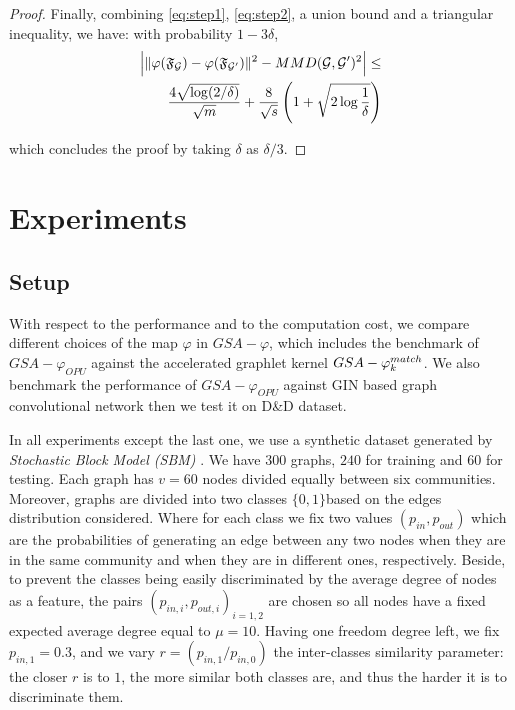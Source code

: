 \documentclass{article}
\begin{document}
\begin{proof}
Finally, combining \eqref{eq:step1}, \eqref{eq:step2}, a union bound and a triangular inequality, we have: with probability $1-3\delta$,
\begin{align*}
\Big|\|\varphi(\mathfrak{F}_{\mathcal{G}}) - \varphi(\mathfrak{F}_{\mathcal{G}'})\|^2 - MMD(\mathcal{G},\mathcal{G}')^2 \Big| \leq \\\frac{4 \sqrt{\log (2/\delta)}}{\sqrt{m}} + \frac{8}{\sqrt{{s}}}\left(1+\sqrt{2\log\frac{1}{\delta}}\right)
\end{align*}

which concludes the proof by taking $\delta$ as $\delta/3$.

\end{proof}

\section{Experiments}\label{sec:experiments}
\subsection{Setup}\label{sec:setup}
With respect to the performance and to the computation cost, we compare different choices of the map $\varphi$ in $GSA-\varphi$, which includes the benchmark of $GSA-\varphi_{OPU}$ against the accelerated graphlet kernel $GSA-\varphi^{match}_k$. We also benchmark the performance of $GSA-\varphi_{OPU}$ against GIN based graph convolutional network then we test it on D\&D dataset. 

In all experiments except the last one, we use a synthetic dataset generated by \emph{Stochastic Block Model (SBM)} \cite{SBM}. We have $300$ graphs, $240$ for training  and $60$ for testing. Each graph has $v=60$ nodes divided equally between six communities. Moreover, graphs are divided into two classes $\{0 , 1\}$based on the edges distribution considered. Where for each class we fix two values $(p_{in} , p_{out})$ which are  the probabilities of generating an edge between any two nodes when they are in the same community and when they are in different ones, respectively. Beside, to prevent the classes being easily discriminated by the average degree of nodes as a feature, the pairs $(p_{in,i} , p_{out,i})_{i=1,2}$ are chosen so all nodes have a fixed expected average degree equal to $\mu=10$. Having one freedom degree left, we fix $p_{in,1}=0.3$, and we vary $r=(p_{in,1}/p_{in,0})$ the inter-classes similarity parameter: the closer $r$ is to $1$, the more similar both classes are, and thus the harder it is to discriminate them.
\end{document}
